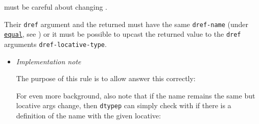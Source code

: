 \label{x-28DREF-EXT-3A-40CAST-NAME-CHANGE-20MGL-PAX-3ASECTION-29}

must be careful about changing
.

Their \texttt{dref} argument and the
 returned must have
the same \texttt{dref-name} (under
\href{http://www.lispworks.com/documentation/HyperSpec/Body/f_equal.htm}{\texttt{equal}},
see ) or it
must be possible to upcast the returned value to the \texttt{dref}
argument\textquotesingle s \texttt{dref-locative-type}.

\begin{itemize}
\item
  \emph{Implementation note}

  The purpose of this rule is to allow
   answer this
  correctly:

\begin{Shaded}
\begin{Highlighting}[]
\NormalTok{(}\NormalTok{()}
\NormalTok{ () (}
\OperatorTok{\textgreater{}}
\OperatorTok{*}\NormalTok{ \textquotesingle{}(}\NormalTok{ () (}
\OperatorTok{=\textgreater{}}
\OperatorTok{**} \NormalTok{)}
\OperatorTok{\textgreater{}}
\end{Highlighting}
\end{Shaded}

  For even more background, also note that if the name remains the same
  but locative args change, then \texttt{dtypep} can simply check with
   if there is a
  definition of the name with the given locative:


\end{itemize}
